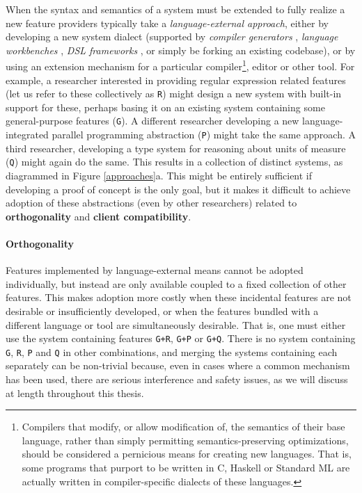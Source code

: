When the syntax and semantics of a system must be extended to fully realize a new feature providers typically take a \emph{language-external approach}, either by developing a new system dialect (supported by \emph{compiler generators} \cite{brooker1963compiler}, \emph{language workbenches} \cite{erdweg2013state}, \emph{DSL frameworks} \cite{fowler2010domain}, or simply be forking an existing codebase), or by using an extension mechanism for a {particular} compiler\footnote{Compilers that modify, or allow modification of, the semantics of their base language, rather than simply permitting semantics-preserving optimizations, should be considered a pernicious means for creating new languages. That is, some programs that purport to be written in C, Haskell or Standard ML are actually written in compiler-specific dialects of these languages.}, editor or other tool. For example, a researcher interested in providing regular expression related features (let us refer to these collectively as \texttt{R}) might design a new system with built-in support for these, perhaps basing it on an existing system containing some general-purpose features (\texttt{G}). A different researcher developing a new language-integrated parallel programming abstraction (\texttt{P}) might  take the same approach. A third researcher, developing a type system for reasoning about units of measure (\texttt{Q}) might again do the same. This results in a collection of distinct systems, as diagrammed in Figure \ref{approaches}a. This might be entirely sufficient if developing a proof of concept is the only goal, but it makes it difficult to achieve adoption of these abstractions (even by other researchers) related to \textbf{orthogonality} and \textbf{client compatibility}.%

\paragraph{Orthogonality} Features implemented by language-external means cannot be adopted individually, but instead are only available coupled to a fixed collection of other features. This makes adoption more costly when these incidental features are  not desirable or insufficiently developed, or when the features bundled with a different language or tool are simultaneously desirable. That is, one must either use the system containing features \texttt{G+R}, \texttt{G+P} or \texttt{G+Q}. There is no system containing \texttt{G}, \texttt{R}, \texttt{P} and \texttt{Q} in other combinations, and merging the systems containing each separately can be non-trivial because, even in cases where a common mechanism has been used, there are serious interference and safety issues, as we will discuss at length throughout this thesis.

